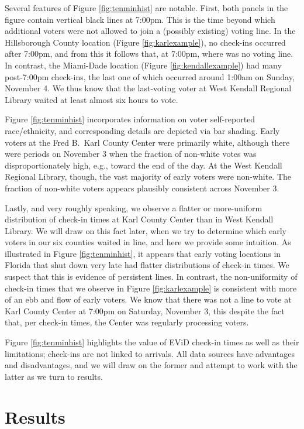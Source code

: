 \documentclass[12pt,titlepage]{article}
\begin{document}
Several features of Figure \ref{fig:tenminhist} are notable.  First,
both panels in the figure contain vertical black lines at 7:00pm.
This is the time beyond which additional voters were not allowed to
join a (possibly existing) voting line.  In the Hillsborough County
location (Figure \ref{fig:karlexample}), no check-ins occurred after
7:00pm, and from this it follows that, at 7:00pm, where was no voting
line.  In contrast, the Miami-Dade location (Figure
\ref{fig:kendallexample}) had many post-7:00pm check-ins, the last one
of which occurred around 1:00am on Sunday, November 4.  We thus know
that the last-voting voter at West Kendall Regional Library waited at
least almost six hours to vote.

Figure \ref{fig:tenminhist} incorporates information on voter
self-reported race/ethnicity, and corresponding details are depicted
via bar shading.  Early voters at the Fred B.\ Karl County Center were
primarily white, although there were periods on November 3 when the
fraction of non-white votes was disproportionately high, e.g., toward
the end of the day.  At the West Kendall Regional Library, though, the
vast majority of early voters were non-white.  The fraction of
non-white voters appears plausibly consistent across November 3.

Lastly, and very roughly speaking, we observe a flatter or
more-uniform distribution of check-in times at Karl County Center than
in West Kendall Library.  We will draw on this fact later, when we try
to determine which early voters in our six counties waited in line,
and here we provide some intuition.  As illustrated in Figure
\ref{fig:tenminhist}, it appears that early voting locations in
Florida that shut down very late had flatter distributions of check-in
times.  We suspect that this is evidence of persistent lines.  In
contrast, the non-uniformity of check-in times that we observe in
Figure \ref{fig:karlexample} is consistent with more of an ebb and
flow of early voters.  We know that there was not a line to vote at
Karl County Center at 7:00pm on Saturday, November 3, this despite the
fact that, per check-in times, the Center was regularly processing
voters.

Figure \ref{fig:tenminhist} highlights the value of EViD check-in
times as well as their limitations; check-ins are not linked to
arrivals.  All data sources have advantages and disadvantages, and we
will draw on the former and attempt to work with the latter as we turn
to results.

\section*{Results}
\end{document}
